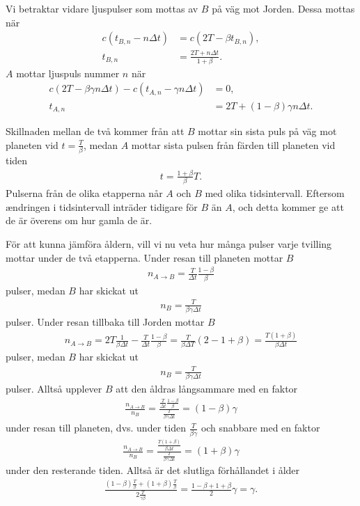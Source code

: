 Vi betraktar vidare ljuspulser som mottas av $B$ på väg mot Jorden. Dessa mottas när
\begin{align*}
	c(t_{B, n} - n\Delta t) &= c(2T - \beta t_{B, n}), \\
	t_{B, n}                &= \frac{2T + n\Delta t}{1 + \beta}.
\end{align*}
$A$ mottar ljuspuls nummer $n$ när
\begin{align*}
	c(2T - \beta\gamma n\Delta t) - c(t_{A, n} - \gamma n\Delta t) &= 0, \\
	t_{A, n}                                                        &= 2T + (1 - \beta)\gamma n\Delta t.
\end{align*}

Skillnaden mellan de två kommer från att $B$ mottar sin sista puls på väg mot planeten vid $t = \frac{T}{\beta}$, medan $A$ mottar sista pulsen från färden till planeten vid tiden
\begin{align*}
	t = \frac{1 + \beta}{\beta}T.
\end{align*}
Pulserna från de olika etapperna når $A$ och $B$ med olika tidsintervall. Eftersom ændringen i tidsintervall inträder tidigare för $B$ än $A$, och detta kommer ge att de är överens om hur gamla de är.

För att kunna jämföra åldern, vill vi nu veta hur många pulser varje tvilling mottar under de två etapperna. Under resan till planeten mottar $B$
\begin{align*}
	n_{A\to B} = \frac{T}{\Delta t}\frac{1 - \beta}{\beta}
\end{align*}
pulser, medan $B$ har skickat ut
\begin{align*}
	n_{B} = \frac{T}{\beta\gamma\Delta t}
\end{align*}
pulser. Under resan tillbaka till Jorden mottar $B$
\begin{align*}
	n_{A\to B} = 2T\frac{1}{\beta\Delta t} - \frac{T}{\Delta t}\frac{1 - \beta}{\beta} = \frac{T}{\beta\Delta T}(2 - 1 + \beta) = \frac{T(1 + \beta)}{\beta\Delta t}
\end{align*}
pulser, medan $B$ har skickat ut
\begin{align*}
	n_{B} = \frac{T}{\beta\gamma\Delta t}
\end{align*}
pulser. Alltså upplever $B$ att den åldras långsammare med en faktor
\begin{align*}
	\frac{n_{A\to B}}{n_{B}} = \frac{\frac{T}{\Delta t}\frac{1 - \beta}{\beta}}{\frac{T}{\beta\gamma\Delta t}} = (1 - \beta)\gamma
\end{align*}
under resan till planeten, dvs. under tiden $\frac{T}{\beta\gamma}$ och snabbare med en faktor
\begin{align*}
	\frac{n_{A\to B}}{n_{B}} = \frac{\frac{T(1 + \beta)}{\beta\Delta t}}{\frac{T}{\beta\gamma\Delta t}} = (1 + \beta)\gamma
\end{align*}
under den resterande tiden. Alltså är det slutliga förhållandet i ålder
\begin{align*}
	\frac{(1 - \beta)\frac{T}{\beta} + (1 + \beta)\frac{T}{\beta}}{2\frac{T}{\gamma\beta}} = \frac{1 - \beta + 1 + \beta}{2}\gamma = \gamma.
\end{align*}

